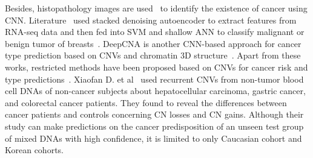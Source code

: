 \hspace*{3.5mm} Besides, histopathology images are used~\cite{19Cruz, xu} to identify the existence of cancer using CNN. Literature~\cite{17Danaee} used stacked denoising autoencoder to extract features from RNA-seq data and then fed into SVM and shallow ANN to classify malignant or benign tumor of breasts~\cite{18Chen}. DeepCNA is another CNN-based approach for cancer type prediction based on CNVs and chromatin 3D structure~\cite{yuan2018cancer}. Apart from these works, restricted methods have been proposed based on CNVs for cancer risk and type predictions~\cite{ding2014application, zhang2016classification, elsadek2018supervised}. Xiaofan D. et al~\cite{ding2014application} used recurrent CNVs from non-tumor blood cell DNAs of non-cancer subjects about hepatocellular carcinoma, gastric cancer, and colorectal cancer patients. They found to reveal the differences between cancer patients and controls concerning CN losses and CN gains. Although their study can make predictions on the cancer predisposition of an unseen test group of mixed DNAs with high confidence, it is limited to only Caucasian cohort and Korean cohorts. 

